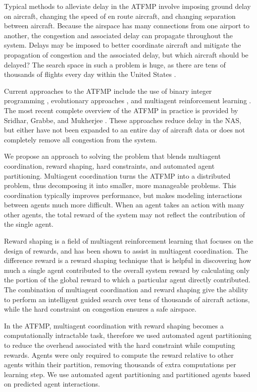 \documentclass{aamas2014}
\begin{document}
Typical methods to alleviate delay in the ATFMP involve imposing ground delay on aircraft, changing the speed of en route aircraft, and changing separation between aircraft. Because the airspace has many connections from one airport to another, the congestion and associated delay can propagate throughout the system. Delays may be imposed to better coordinate aircraft and mitigate the propagation of congestion and the associated delay, but which aircraft should be delayed? The search space in such a problem is huge, as there are tens of thousands of flights every day within the United States \cite{faa05}.

Current approaches to the ATFMP include the use of binary integer programming \cite{Bertsimas}, evolutionary approaches \cite{Rios}, and multiagent reinforcement learning \cite{tumer-agogino_jaamas12}. The most recent complete overview of the ATFMP in practice is provided by Sridhar, Grabbe, and Mukherjee \cite{Sridhar}. These approaches reduce delay in the NAS, but either have not been expanded to an entire day of aircraft data or does not completely remove all congestion from the system. 

We propose an approach to solving the problem that blends multiagent coordination, reward shaping, hard constraints, and automated agent partitioning. Multiagent coordination turns the ATFMP into a distributed problem, thus decomposing it into smaller, more manageable problems. This coordination typically improves performance, but makes modeling interactions between agents much more difficult. When an agent takes an action with many other agents, the total reward of the system may not reflect the contribution of the single agent. 

Reward shaping is a field of multiagent reinforcement learning that focuses on the design of rewards, and has been shown to assist in multiagent coordination. The difference reward is a reward shaping technique that is helpful in discovering how much a single agent contributed to the overall system reward by calculating only the portion of the global reward to which a particular agent directly contributed. The combination of multiagent coordination and reward shaping give the ability to perform an intelligent guided search over tens of thousands of aircraft actions, while the hard constraint on congestion ensures a safe airspace.

In the ATFMP, multiagent coordination with reward shaping becomes a computationally intractable task, therefore we used automated agent partitioning to reduce the overhead associated with the hard constraint while computing rewards. Agents were only required to compute the reward relative to other agents within their partition, removing thousands of extra computations per learning step. We use automated agent partitioning and partitioned agents based on predicted agent interactions.
\end{document}
